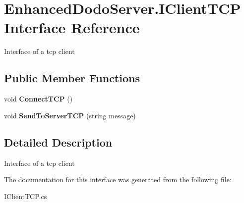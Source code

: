 \hypertarget{interface_enhanced_dodo_server_1_1_i_client_t_c_p}{}\section{Enhanced\+Dodo\+Server.\+I\+Client\+T\+CP Interface Reference}
\label{interface_enhanced_dodo_server_1_1_i_client_t_c_p}


Interface of a tcp client  


\subsection*{Public Member Functions}
\begin{DoxyCompactItemize}
\item 
\mbox{\label{interface_enhanced_dodo_server_1_1_i_client_t_c_p_a05e8d7231dfa3c4c98ee1cb6e6c858ca}} 
void {\bfseries Connect\+T\+CP} ()
\item 
\mbox{\label{interface_enhanced_dodo_server_1_1_i_client_t_c_p_a494fc807b06942f0144a4ae0f6f9c3f1}} 
void {\bfseries Send\+To\+Server\+T\+CP} (string message)
\end{DoxyCompactItemize}


\subsection{Detailed Description}
Interface of a tcp client 



The documentation for this interface was generated from the following file\+:\begin{DoxyCompactItemize}
\item 
I\+Client\+T\+C\+P.\+cs\end{DoxyCompactItemize}
